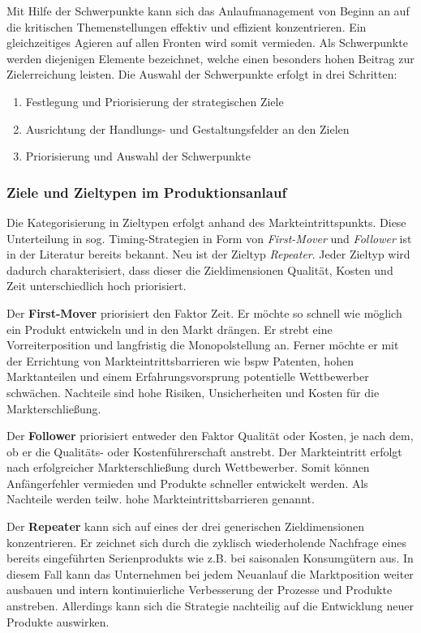 Mit Hilfe der Schwerpunkte kann sich das Anlaufmanagement von Beginn an auf die kritischen Themenstellungen effektiv und effizient konzentrieren. Ein gleichzeitiges Agieren auf allen Fronten wird somit vermieden. Als Schwerpunkte werden diejenigen Elemente bezeichnet, welche einen besonders hohen Beitrag zur Zielerreichung leisten. 
Die Auswahl der Schwerpunkte erfolgt in drei Schritten: 
\begin{enumerate}
 \item Festlegung und Priorisierung der strategischen Ziele
 \item Ausrichtung der Handlungs- und Gestaltungsfelder an den Zielen
 \item Priorisierung und Auswahl der Schwerpunkte
\end{enumerate}

\subsubsection{Ziele und Zieltypen im Produktionsanlauf}
Die Kategorisierung in Zieltypen erfolgt anhand des Markteintrittspunkts. Diese Unterteilung in sog. Timing-Strategien in Form von \textit{First-Mover} und \textit{Follower} ist in der Literatur bereits bekannt. Neu ist der Zieltyp \textit{Repeater}. Jeder Zieltyp wird dadurch charakterisiert, dass dieser die Zieldimensionen Qualität, Kosten und Zeit unterschiedlich hoch priorisiert. 

Der \textbf{First-Mover} priorisiert den Faktor Zeit. Er möchte so schnell wie möglich ein Produkt entwickeln und in den Markt drängen. Er strebt eine Vorreiterposition und langfristig die Monopolstellung an. Ferner möchte er mit der Errichtung von Markteintrittsbarrieren wie \gls{bspw} Patenten, hohen Marktanteilen und einem Erfahrungsvorsprung potentielle Wettbewerber schwächen. 
Nachteile sind hohe Risiken, Unsicherheiten und Kosten für die Markterschließung. 

Der \textbf{Follower} priorisiert entweder den Faktor Qualität oder Kosten, je nach dem, ob er die Qualitäts- oder Kostenführerschaft anstrebt. Der Markteintritt erfolgt nach erfolgreicher Markterschließung durch Wettbewerber. Somit können Anfängerfehler vermieden und Produkte schneller entwickelt werden. Als Nachteile werden teilw. hohe Markteintrittsbarrieren genannt. 

Der \textbf{Repeater} kann sich auf eines der drei generischen Zieldimensionen konzentrieren. Er zeichnet sich durch die zyklisch wiederholende Nachfrage eines bereits eingeführten Serienprodukts wie z.B. bei saisonalen Konsumgütern aus. In diesem Fall kann das Unternehmen bei jedem Neuanlauf die Marktposition weiter ausbauen und intern kontinuierliche Verbesserung der Prozesse und Produkte anstreben. Allerdings kann sich die Strategie nachteilig auf die Entwicklung neuer Produkte auswirken. 

